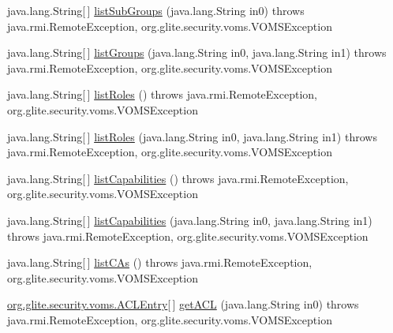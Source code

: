 \begin{DoxyCompactItemize}
java.lang.String\mbox{[}$\,$\mbox{]} \hyperlink{classorg_1_1glite_1_1security_1_1voms_1_1service_1_1admin_1_1VOMSAdminSoapBindingStub_abd62168882e397377a5cdb1afd370105}{listSubGroups} (java.lang.String in0)  throws java.rmi.RemoteException, org.glite.security.voms.VOMSException 
\item 
java.lang.String\mbox{[}$\,$\mbox{]} \hyperlink{classorg_1_1glite_1_1security_1_1voms_1_1service_1_1admin_1_1VOMSAdminSoapBindingStub_a72db19b1cf3430a57c2639d44a1edf27}{listGroups} (java.lang.String in0, java.lang.String in1)  throws java.rmi.RemoteException, org.glite.security.voms.VOMSException 
\item 
java.lang.String\mbox{[}$\,$\mbox{]} \hyperlink{classorg_1_1glite_1_1security_1_1voms_1_1service_1_1admin_1_1VOMSAdminSoapBindingStub_a278ae52b581544f12834d7253c6fc5ec}{listRoles} ()  throws java.rmi.RemoteException, org.glite.security.voms.VOMSException 
\item 
java.lang.String\mbox{[}$\,$\mbox{]} \hyperlink{classorg_1_1glite_1_1security_1_1voms_1_1service_1_1admin_1_1VOMSAdminSoapBindingStub_ac471f674aaaeea63fe1171f642c958b4}{listRoles} (java.lang.String in0, java.lang.String in1)  throws java.rmi.RemoteException, org.glite.security.voms.VOMSException 
\item 
java.lang.String\mbox{[}$\,$\mbox{]} \hyperlink{classorg_1_1glite_1_1security_1_1voms_1_1service_1_1admin_1_1VOMSAdminSoapBindingStub_a9bddc0b5d223327ffcf3654db8cbc0d0}{listCapabilities} ()  throws java.rmi.RemoteException, org.glite.security.voms.VOMSException 
\item 
java.lang.String\mbox{[}$\,$\mbox{]} \hyperlink{classorg_1_1glite_1_1security_1_1voms_1_1service_1_1admin_1_1VOMSAdminSoapBindingStub_a68ee4cceedd7e823303851f032fc38c2}{listCapabilities} (java.lang.String in0, java.lang.String in1)  throws java.rmi.RemoteException, org.glite.security.voms.VOMSException 
\item 
java.lang.String\mbox{[}$\,$\mbox{]} \hyperlink{classorg_1_1glite_1_1security_1_1voms_1_1service_1_1admin_1_1VOMSAdminSoapBindingStub_a7cf640a4154ea33427458c7956d40723}{listCAs} ()  throws java.rmi.RemoteException, org.glite.security.voms.VOMSException 
\item 
\hyperlink{classorg_1_1glite_1_1security_1_1voms_1_1ACLEntry}{org.glite.security.voms.ACLEntry}\mbox{[}$\,$\mbox{]} \hyperlink{classorg_1_1glite_1_1security_1_1voms_1_1service_1_1admin_1_1VOMSAdminSoapBindingStub_a7d1a1a228511e930794d8b9480b1c380}{getACL} (java.lang.String in0)  throws java.rmi.RemoteException, org.glite.security.voms.VOMSException 

\end{DoxyCompactItemize}
